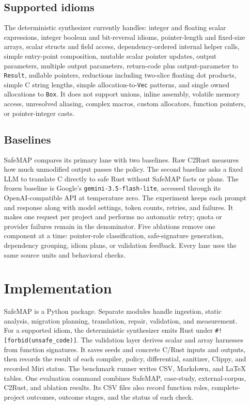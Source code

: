 \documentclass[conference]{IEEEtran}
\newcommand{\tool}{SafeMAP\xspace}
\begin{document}
\subsection{Supported idioms}

The deterministic synthesizer currently handles:
integer and floating scalar expressions, integer boolean and bit-reversal
idioms, pointer-length and fixed-size arrays, scalar structs and field access,
dependency-ordered internal helper calls, simple entry-point composition,
mutable scalar pointer updates, output
parameters, multiple output parameters, return-code plus output-parameter to
\texttt{Result}, nullable pointers, reductions including two-slice floating
dot products, simple C string lengths, simple allocation-to-\texttt{Vec}
patterns, and single owned allocations to \texttt{Box}. It does not support
unions, inline assembly, volatile memory access, unresolved aliasing, complex
macros, custom allocators, function pointers, or pointer-integer casts.

\subsection{Baselines}

\tool compares its primary lane with two baselines. Raw C2Rust measures how much
unmodified output passes the policy. The second baseline asks a fixed LLM to
translate C directly to safe Rust without \tool facts or plans. The frozen
baseline is Google's \texttt{gemini-3.5-flash-lite}, accessed through its
OpenAI-compatible API at temperature zero. The experiment keeps each prompt
and response along with model settings, token counts, retries, and failures. It
makes one request per project and performs no automatic retry; quota or provider
failures remain in the denominator. Five ablations remove one component at a time: pointer-role
classification, safe-signature generation, dependency grouping, idiom plans,
or validation feedback. Every lane uses the same source units and behavioral
checks.

\section{Implementation}

\tool is a Python package. Separate modules handle ingestion, static analysis,
migration planning, translation, repair, validation, and measurement. For a
supported idiom, the deterministic synthesizer emits Rust under
\texttt{\#![forbid(unsafe\_code)]}. The validation layer derives scalar and
array harnesses from function signatures. It saves seeds and concrete C/Rust
inputs and outputs, then records the result of each compiler, policy,
differential, sanitizer, Clippy, and recorded Miri status. The benchmark runner writes
CSV, Markdown, and LaTeX tables. One evaluation command combines \tool,
case-study, external-corpus, C2Rust, and ablation results. Its CSV files also
record function roles, complete-project outcomes, outcome stages, and the
status of each check.
\end{document}
